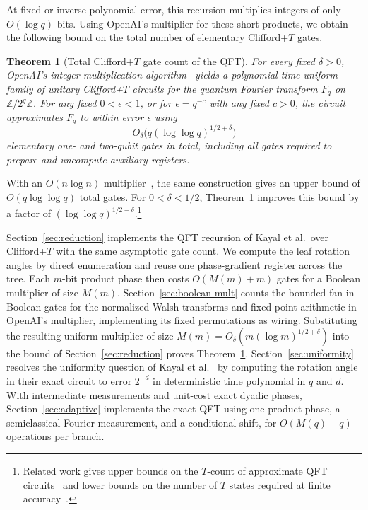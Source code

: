 \documentclass[11pt]{article}
\newtheorem{theorem}{Theorem}
\newcommand{\CFT}{Clifford+$T$}
\begin{document}
At fixed or inverse-polynomial error, this recursion multiplies integers of only $O(\log q)$ bits. Using OpenAI's multiplier for these short products, we obtain the following bound on the total number of elementary \CFT{} gates.

\begin{theorem}[Total \CFT{} gate count of the QFT]\label{thm:main}
For every fixed $\delta > 0$, OpenAI's integer multiplication algorithm~\cite{openai2026mult} yields a polynomial-time uniform family of unitary \CFT{} circuits for the quantum Fourier transform $F_q$ on $\mathbb{Z}/2^q\mathbb{Z}$. For any fixed $0 < \epsilon < 1$, or for $\epsilon = q^{-c}$ with any fixed $c > 0$, the circuit approximates $F_q$ to within error $\epsilon$ using
\begin{equation}\label{eq:main-bound}
O_\delta\bigl(q(\log\log q)^{1/2+\delta}\bigr)
\end{equation}
elementary one- and two-qubit gates in total, including all gates required to prepare and uncompute auxiliary registers.
\end{theorem}

With an $O(n\log n)$ multiplier~\cite{hvdh2021}, the same construction gives an upper bound of $O(q\log\log q)$ total gates. For $0<\delta<1/2$, Theorem~\ref{thm:main} improves this bound by a factor of $(\log\log q)^{1/2-\delta}$.\footnote{Related work gives upper bounds on the $T$-count of approximate QFT circuits~\cite{nsm2020,pa2025} and lower bounds on the number of $T$ states required at finite accuracy~\cite{zhu2026}.}

Section~\ref{sec:reduction} implements the QFT recursion of Kayal et al.\ over \CFT{} with the same asymptotic gate count. We compute the leaf rotation angles by direct enumeration and reuse one phase-gradient register across the tree. Each $m$-bit product phase then costs $O(M(m)+m)$ gates for a Boolean multiplier of size $M(m)$. Section~\ref{sec:boolean-mult} counts the bounded-fan-in Boolean gates for the normalized Walsh transforms and fixed-point arithmetic in OpenAI's multiplier, implementing its fixed permutations as wiring. Substituting the resulting uniform multiplier of size $M(m)=O_\delta(m(\log m)^{1/2+\delta})$ into the bound of Section~\ref{sec:reduction} proves Theorem~\ref{thm:main}. Section~\ref{sec:uniformity} resolves the uniformity question of Kayal et al.~\cite[Section~5]{kmps2026} by computing the rotation angle in their exact circuit to error $2^{-d}$ in deterministic time polynomial in $q$ and $d$. With intermediate measurements and unit-cost exact dyadic phases, Section~\ref{sec:adaptive} implements the exact QFT using one product phase, a semiclassical Fourier measurement, and a conditional shift, for $O(M(q)+q)$ operations per branch.
\end{document}
